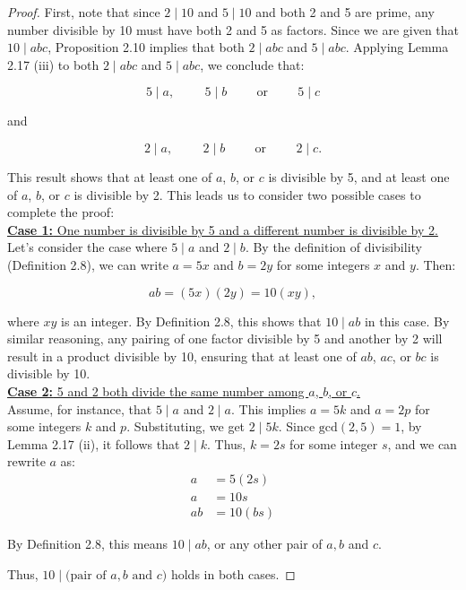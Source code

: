 \documentclass{article}
\begin{document}
\begin{proof}
    First, note that since $2 \mid 10$ and $5 \mid 10$ and both 2 and 5 are prime, any number divisible by 10 must have both 2 and 5 as factors. Since we are given that $10 \mid abc$, Proposition 2.10 implies that both $2 \mid abc$ and $5 \mid abc$. Applying Lemma 2.17 (iii) to both $2 \mid abc$ and $5 \mid abc$, we conclude that:

    $$
    5 \mid a, \hspace{1cm} 5 \mid b \hspace{1cm} \text{or} \hspace{1cm} 5 \mid c
    $$

    and

    $$
    2 \mid a, \hspace{1cm} 2 \mid b \hspace{1cm} \text{or} \hspace{1cm} 2 \mid c.
    $$

    This result shows that at least one of $a$, $b$, or $c$ is divisible by 5, and at least one of $a$, $b$, or $c$ is divisible by 2. This leads us to consider two possible cases to complete the proof:\\

    \underline{\textbf{Case 1:} One number is divisible by 5 and a different number is divisible by 2.}\\

      Let’s consider the case where $5 \mid a$ and $2 \mid b$. By the definition of divisibility (Definition 2.8), we can write $a = 5x$ and $b = 2y$ for some integers $x$ and $y$. Then:

    $$
    ab = (5x)(2y) = 10(xy),
    $$

    where $xy$ is an integer. By Definition 2.8, this shows that $10 \mid ab$ in this case. By similar reasoning, any pairing of one factor divisible by 5 and another by 2 will result in a product divisible by 10, ensuring that at least one of $ab$, $ac$, or $bc$ is divisible by 10.\\
    
    \underline{\textbf{Case 2:} 5 and 2 both divide the same number among $a$, $b$, or $c$.}\\

    Assume, for instance, that $5 \mid a$ and $2 \mid a$. This implies $a = 5k$ and $a = 2p$ for some integers $k$ and $p$. Substituting, we get $2 \mid 5k$. Since $\text{gcd}(2,5) = 1$, by Lemma 2.17 (ii), it follows that $2 \mid k$. Thus, $k = 2s$ for some integer $s$, and we can rewrite $a$ as:
    \begin{align*}
        a &= 5(2s) \\
        a &= 10s \\
        ab &= 10(bs)
    \end{align*}

    By Definition 2.8, this means $10 \mid ab$, or any other pair of $a,b$ and $c$.

    Thus, $10 \mid \text{(pair of $a,b$ and $c$)}$ holds in both cases.
\end{proof}
\end{document}
